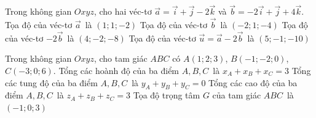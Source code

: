 

\begin{ex}%
	Trong không gian $Oxyz$, cho  hai véc-tơ $\overrightarrow{a}=\overrightarrow{i}+\overrightarrow{j}-2\overrightarrow{k}$ và $\overrightarrow{b}=-2\overrightarrow{i}+\overrightarrow{j}+4\overrightarrow{k}$.
	 \choiceTF
		{\True Tọa độ của  véc-tơ $\overrightarrow{a}$~là $(1;1;-2)$}
		{Tọa độ của véc-tơ $\overrightarrow{b}$~là $(-2;1;-4)$} 
		{\True Tọa  độ của véc-tơ $-2\overrightarrow{b}$~là $(4;-2;-8)$}
		{\True Tọa độ  của véc-tơ $\overrightarrow{u}=\overrightarrow{a}-2\overrightarrow{b}$~là $(5;-1;-10)$}
\end{ex}

\begin{ex}%
	Trong không gian $Oxyz$, cho tam giác $ABC$  có $A(1;2;3)$, $B(-1;-2;0)$, $C(-3;0;6)$.
	 \choiceTF
		{Tổng các hoành độ của ba  điểm $A,B,C$~là $x_A+x_B+x_C=3$}
		 {\True Tổng các tung độ của ba điểm $A,B,C$~là $y_A+y_B+y_C=0$}
		{Tổng  các cao độ của ba điểm $A,B,C$~là $z_A+z_B+z_C=3$}
		{\True Tọa độ trọng tâm $G$ của tam giác  $ABC$~là $(-1;0;3)$}
\end{ex}

